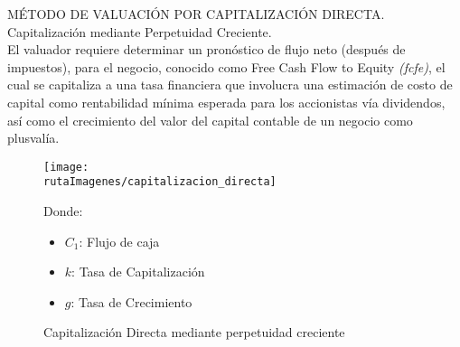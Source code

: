 \textcolor{principal}{M\'ETODO DE VALUACI\'ON POR CAPITALIZACI\'ON DIRECTA. }\\

\textcolor{principal}{Capitalizaci\'on mediante Perpetuidad Creciente.} \\

El valuador requiere determinar un pron\'ostico de flujo neto (despu\'es de impuestos), para el negocio, conocido como \textcolor{principal}{Free Cash Flow to Equity \textit{(\gls{fcfe})}}, el cual se capitaliza a una tasa financiera que involucra una estimaci\'on de costo de capital como rentabilidad m\'inima esperada para los accionistas v\'ia dividendos, as\'i como el crecimiento del valor del capital contable de un negocio como plusval\'ia.


\begin{center}
\begin{figure}[H]
\centering
\begin{minipage}{8cm}
\centering
	\caption{Capitalizaci\'on Directa mediante perpetuidad creciente\label{fig:cap_dir}}
	
	\texttt{[image: \\rutaImagenes/capitalizacion\_directa]}
	\end{minipage}
	 \hspace{1pt} \begin{minipage}{5cm}
	Donde:
	\begin{itemize}
	
		\item $C_1$: Flujo de caja
		\item $k$: Tasa de Capitalizaci\'on
		\item $g$: Tasa de Crecimiento
	\end{itemize}
	\end{minipage}
\end{figure}
\end{center}



